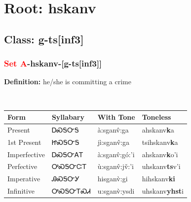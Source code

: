 \needspace{4in}
\section*{Root: hskanv}
\nopagebreak
{}
\needspace{3in}
\subsection*{Class: g-ts[inf3]}
\nopagebreak
\needspace{2in}
\subsubsection*{\textcolor{Red}{Set A}{-}\textbf{hskanv}{-}[g-ts[inf3]]}
\nopagebreak
\textbf{Definition: } he/she is committing a crime
\\[0.5em]
\begin{tabularx}{\textwidth}{l X X X}%
\toprule%
\textbf{Form}&\textbf{Syllabary}&\textbf{With Tone}&\textbf{Toneless}\\%
\midrule%
Present&ᎠᏍᎦᏅᎦ&à:sganv̂:ga&ahskanv\textbf{k}a\\%
1st Present&ᏥᏍᎦᏅᎦ&jì:sganv̂:ga&tsihskanv\textbf{k}a\\%
Imperfective&ᎠᏍᎦᏅᎪᎢ&à:sganv̂:gó:’i&ahskanv\textbf{k}o'i\\%
Perfective&ᎤᏍᎦᏅᏨᎢ&ù:sganv̂:jv̌:’i&uhskanv\textbf{ts}v'i\\%
Imperative&ᎯᏍᎦᏅᎩ&hisganv̀:gi&hihskanv\textbf{ki}\\%
Infinitive&ᎤᏍᎦᏅᎢᏍᏗ&u:sganv̀:ysdi&uhskanv\textbf{yhst}i\\%
\bottomrule%
\end{tabularx}
\\[1em]